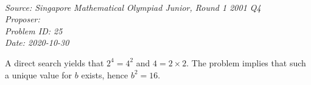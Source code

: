 \SSbreak\\
\emph{Source: Singapore Mathematical Olympiad Junior, Round 1 2001 Q4}\\
\emph{Proposer: \Pbrain}\\
\emph{Problem ID: 25}\\
\emph{Date: 2020-10-30}\\
\SSbreak

\bigskip

\begin{solution}\hfil\medskip

    A direct search yields that $2^4 = 4^2$ and $4 = 2 \times 2$. The problem implies that such a unique value for $b$ exists, hence $b^2 = \boxed{16}$.
\end{solution}\bigskip